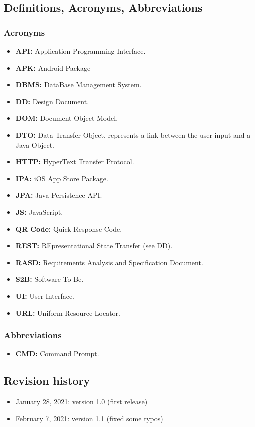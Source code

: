 \documentclass[table, 12pt]{article}
\begin{document}
\subsection{Definitions, Acronyms, Abbreviations}
\subsubsection{Acronyms}
\begin{itemize}
    \item \textbf{API:} Application Programming Interface.
    \item \textbf{APK:} Android Package
    \item \textbf{DBMS:} DataBase Management System.
    \item \textbf{DD:} Design Document.
    \item \textbf{DOM:} Document Object Model.
    \item \textbf{DTO:} Data Transfer Object, represents a link between the user input and a Java Object.
    \item \textbf{HTTP:} HyperText Transfer Protocol.
    \item \textbf{IPA:} iOS App Store Package.
    \item \textbf{JPA:} Java Persistence API.
    \item \textbf{JS:} JavaScript.
    \item \textbf{QR Code:} Quick Response Code.
    \item \textbf{REST:} REpresentational State Transfer (see DD).
    \item \textbf{RASD:} Requirements Analysis and Specification Document.
    \item \textbf{S2B:} Software To Be.
    \item \textbf{UI:} User Interface.
    \item \textbf{URL:} Uniform Resource Locator.
\end{itemize}

\subsubsection{Abbreviations}
\begin{itemize}
    \item \textbf{CMD:} Command Prompt.
\end{itemize}

\subsection{Revision history}
\begin{itemize}
    \item January 28, 2021: version 1.0 (first release)
    \item February 7, 2021: version 1.1 (fixed some typos)
\end{itemize}
\end{document}

